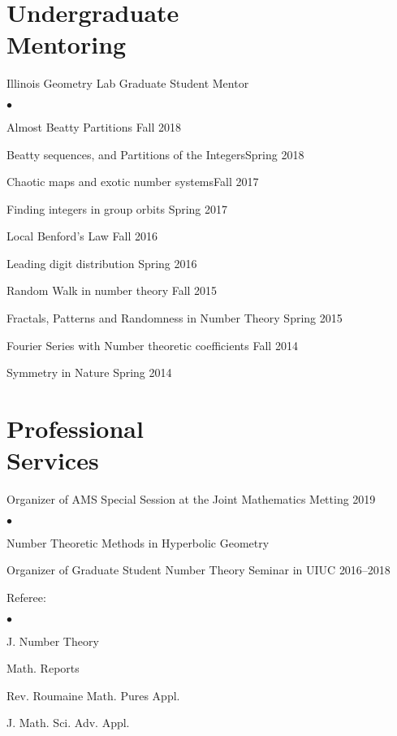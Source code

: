 \documentclass[margin,line,pifont,palatino,courier]{res}
\newenvironment{list1}{
  \begin{list}{\ding{113}}{%
      \setlength{\itemsep}{0in}
      \setlength{\parsep}{0in} \setlength{\parskip}{0in}
      \setlength{\topsep}{0in} \setlength{\partopsep}{0in}
      \setlength{\leftmargin}{0.17in}}}{\end{list}}
\newenvironment{list2}{
  \begin{list}{$\bullet$}{%
      \setlength{\itemsep}{0in}
      \setlength{\parsep}{0in} \setlength{\parskip}{0in}
      \setlength{\topsep}{0in} \setlength{\partopsep}{0in}
      \setlength{\leftmargin}{0.2in}}}{\end{list}}
\begin{document}
\begin{resume}
\section{\sc Undergraduate \\Mentoring}
\begin{list1}
	\item{Illinois Geometry Lab Graduate Student Mentor}
	\begin{list2}
		\item Almost Beatty Partitions {\hfill  Fall 2018}
		\item Beatty sequences, and Partitions of the Integers{\hfill  Spring 2018}
		\item Chaotic maps and exotic number systems{\hfill  Fall 2017}
		\item Finding integers in group orbits {\hfill  Spring 2017}
		\item Local Benford's Law {\hfill  Fall 2016} 
		\item Leading digit distribution {\hfill  Spring 2016} 
		\item Random Walk in number theory {\hfill  Fall 2015} 
		\item Fractals, Patterns and Randomness in Number Theory {\hfill Spring 2015} 
		\item Fourier Series with Number theoretic coefficients {\hfill  Fall 2014} 
		\item Symmetry in Nature {\hfill Spring 2014}
	\end{list2}
\end{list1}

\section{\sc Professional \\Services}

\begin{list1}
	\item{Organizer of AMS Special Session at the Joint Mathematics Metting} {\hfill  2019}
	
	\begin{list2}
		\item Number Theoretic Methods in Hyperbolic Geometry 
	\end{list2}
	\item{Organizer of Graduate Student Number Theory Seminar in UIUC} {\hfill 2016--2018}
	\item Referee: 
	\begin{list2}
		\item J. Number Theory
		\item Math. Reports
		\item  Rev. Roumaine Math. Pures Appl.
		\item  J. Math. Sci. Adv. Appl.
	\end{list2}
	

\end{list1}
\end{resume}
\end{document}

